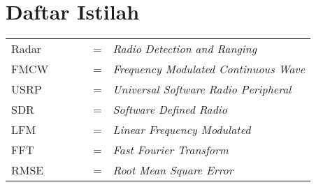 \chapter*{Daftar Istilah}

\begin{tabular}{l c c c c l}
    Radar & & & & = & \textit{Radio Detection and Ranging} \\
    FMCW & & & & = & \textit{Frequency Modulated Continuous Wave} \\
    USRP & & & & = & \textit{Universal Software Radio Peripheral} \\
    SDR & & & & = & \textit{Software Defined Radio} \\
    LFM & & & & = & \textit{Linear Frequency Modulated} \\
    FFT & & & & = & \textit{Fast Fourier Transform} \\
    RMSE & & & & = & \textit{Root Mean Square Error} \\
    
\end{tabular}
